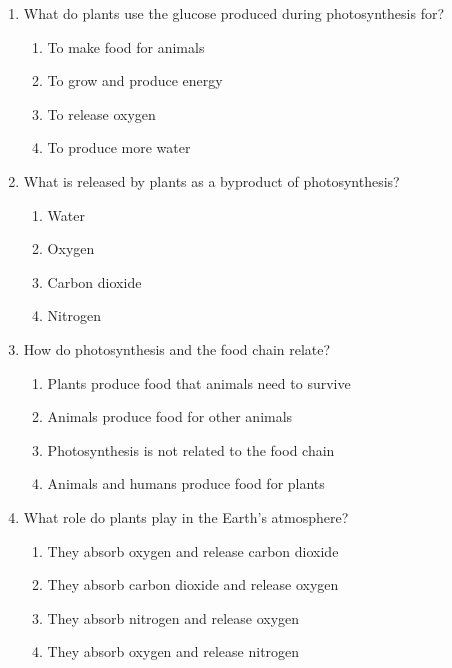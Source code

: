 \documentclass[12pt]{article}
\begin{document}
\begin{enumerate}
    \vspace{0.5cm}

    \item What do plants use the glucose produced during photosynthesis for?

    \begin{enumerate}[label=\Alph*.]
        \item To make food for animals
        \item To grow and produce energy
        \item To release oxygen
        \item To produce more water
    \end{enumerate}
    
    \vspace{0.5cm}

    \item What is released by plants as a byproduct of photosynthesis?

    \begin{enumerate}[label=\Alph*.]
        \item Water
        \item Oxygen
        \item Carbon dioxide
        \item Nitrogen
    \end{enumerate}
    
    \vspace{0.5cm}

    \item How do photosynthesis and the food chain relate?

    \begin{enumerate}[label=\Alph*.]
        \item Plants produce food that animals need to survive
        \item Animals produce food for other animals
        \item Photosynthesis is not related to the food chain
        \item Animals and humans produce food for plants
    \end{enumerate}
    
    \vspace{0.5cm}

    \item What role do plants play in the Earth’s atmosphere?

    \begin{enumerate}[label=\Alph*.]
        \item They absorb oxygen and release carbon dioxide
        \item They absorb carbon dioxide and release oxygen
        \item They absorb nitrogen and release oxygen
        \item They absorb oxygen and release nitrogen
    \end{enumerate}
    

\end{enumerate}
\end{document}
